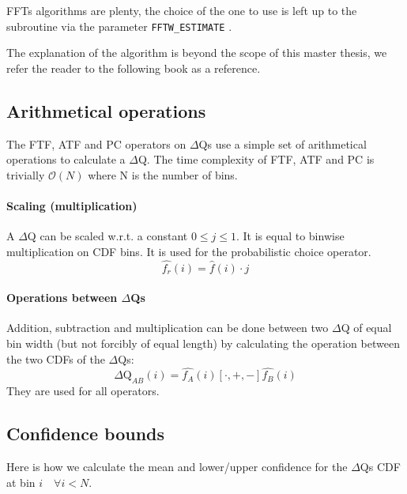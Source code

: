     FFTs algorithms are plenty, the choice of the one to use is left up to the subroutine via the parameter \texttt{FFTW\_ESTIMATE} \cite{fft-h}.
    
    The explanation of the algorithm is beyond the scope of this master thesis, we refer the reader to the following book as a reference. \cite{fft-book}

    \subsection{Arithmetical operations}
        The FTF, ATF and PC operators on $\Delta$Qs use a simple set of arithmetical operations to calculate a $\Delta$Q.   
    The time complexity of FTF, ATF and PC is trivially $\mathcal{O}(N)$ where N is the number of bins.
 
    \paragraph{Scaling (multiplication)} A $\Delta$Q can be scaled w.r.t. a constant $0 \le j \le 1$. It is equal to binwise multiplication on CDF bins. It is used for the probabilistic choice operator.
    \begin{equation}
        \hat{f_r}(i) = \hat{f}(i) \cdot j
        \label{eq:mul_ecdf}
    \end{equation}

    \paragraph{Operations between $\Delta$Qs} 
        Addition, subtraction and multiplication can be done between two $\Delta$Q of equal bin width (but not forcibly of equal length) by calculating the operation between the two CDFs of the $\Delta$Qs:
        \begin{equation}
            \Delta \text{Q}_{AB}(i) = \hat{f_A}(i) [\cdot, +, -] \hat{f_B}(i)
            \label{eq:op_dq}
        \end{equation}
    They are used for all operators.

    \subsection{Confidence bounds}
        Here is how we calculate the mean and lower/upper confidence for the $\Delta$Qs CDF at bin $i \quad \forall i < N$. \cite{stat}

